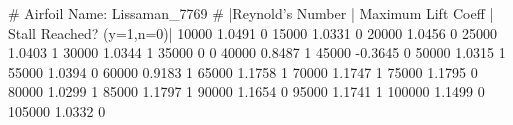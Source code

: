 # Airfoil Name: Lissaman_7769
# |Reynold's Number | Maximum Lift Coeff | Stall Reached? (y=1,n=0)|
10000 1.0491 0
15000 1.0331 0
20000 1.0456 0
25000 1.0403 1
30000 1.0344 1
35000 0   0
40000 0.8487 1
45000 -0.3645 0
50000 1.0315 1
55000 1.0394 0
60000 0.9183 1
65000 1.1758 1
70000 1.1747 1
75000 1.1795 0
80000 1.0299 1
85000 1.1797 1
90000 1.1654 0
95000 1.1741 1
100000 1.1499 0
105000 1.0332 0

